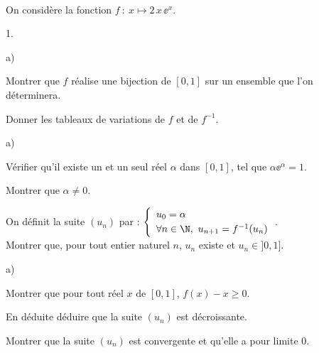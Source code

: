 \documentclass[11pt]{article}%
\begin{document}
 
 \begin{exercice}~\\
 On considère la fonction $f \ : \ x \mapsto 2 \, x \, \ee^x$.
 \begin{noliste}{1.}
 \item \begin{noliste}{a)}
	\item Montrer que $f$ réalise une bijection de $[0,1]$ sur un 
 ensemble que l'on déterminera.
 	\item Donner les tableaux de variations de $f$ et de $f^{-1}$.
 	\end{noliste}
 \item \begin{noliste}{a)}
	\item Vérifier qu'il existe un et un seul réel $\alpha$ dans 
 $[0,1]$, tel que $\alpha \ee^\alpha =1$.
 	\item Montrer que $\alpha \neq 0$.
 	\end{noliste}
 \item On définit la suite $(u_n)$ par : $ \left\{ 
 \begin{array}{l}
 u_0=\alpha
 \\[.1cm]
 \forall n \in \N, \ u_{n+1}=f^{-1}(u_n)
 \end{array} 
 \right.$.\\
 Montrer que, pour tout entier naturel $n$, $u_n$ existe et $u_n \in 
 ]0,1]$.
 \item \begin{noliste}{a)}
 	\item Montrer que pour tout réel $x$ de $[0,1]$, $f(x)-x \geq 
 0$.
 	\item En déduite déduire que la suite $(u_n)$ est décroissante.
 	\item Montrer que la suite $(u_n)$ est convergente et qu'elle a 
 pour limite $0$.
	\end{noliste}
 \end{noliste}
 \end{exercice}
 
 \newpage
 
\end{document}
